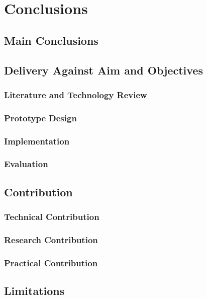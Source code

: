 \chapter{Conclusions}

\section{Main Conclusions}

\section{Delivery Against Aim and Objectives}
\subsection{Literature and Technology Review}
\subsection{Prototype Design}
\subsection{Implementation}
\subsection{Evaluation}

\section{Contribution}
\subsection{Technical Contribution}
\subsection{Research Contribution}
\subsection{Practical Contribution}

\section{Limitations}

